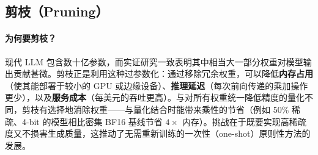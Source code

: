 \subsection{剪枝（Pruning）}
\label{pruning}

\paragraph{为何要剪枝？}
\label{why-prune}

现代 LLM 包含数十亿参数，而实证研究一致表明其中相当大一部分权重对模型输出贡献甚微。剪枝正是利用这种过参数化：通过移除冗余权重，可以降低\textbf{内存占用}（使其能部署于较小的 GPU 或边缘设备）、\textbf{推理延迟}（每次前向传递的乘加操作更少），以及\textbf{服务成本}（每美元的吞吐更高）。与对所有权重统一降低精度的量化不同，剪枝有选择地消除权重——与量化结合时能带来乘性的节省（例如 50\% 稀疏、4-bit 的模型相比密集 BF16 基线节省 $4\times$ 内存）。挑战在于既要实现高稀疏度又不损害生成质量，这推动了无需重新训练的一次性（one-shot）原则性方法的发展。

